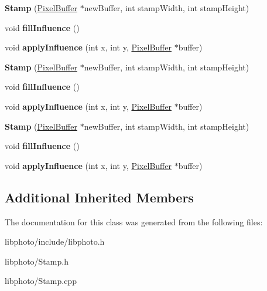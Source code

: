 \begin{DoxyCompactItemize}
\item 
\hypertarget{classStamp_a92ac49815361090e983b1adf13451dc5}{{\bfseries Stamp} (\hyperlink{classPixelBuffer}{Pixel\-Buffer} $\ast$new\-Buffer, int stamp\-Width, int stamp\-Height)}\label{classStamp_a92ac49815361090e983b1adf13451dc5}

\item 
\hypertarget{classStamp_a327f68b52c3043a538180461d5b96cb9}{void {\bfseries fill\-Influence} ()}\label{classStamp_a327f68b52c3043a538180461d5b96cb9}

\item 
\hypertarget{classStamp_ab41c9de007e2ad05a6b47e62b41fd7df}{void {\bfseries apply\-Influence} (int x, int y, \hyperlink{classPixelBuffer}{Pixel\-Buffer} $\ast$buffer)}\label{classStamp_ab41c9de007e2ad05a6b47e62b41fd7df}

\item 
\hypertarget{classStamp_a92ac49815361090e983b1adf13451dc5}{{\bfseries Stamp} (\hyperlink{classPixelBuffer}{Pixel\-Buffer} $\ast$new\-Buffer, int stamp\-Width, int stamp\-Height)}\label{classStamp_a92ac49815361090e983b1adf13451dc5}

\item 
\hypertarget{classStamp_a327f68b52c3043a538180461d5b96cb9}{void {\bfseries fill\-Influence} ()}\label{classStamp_a327f68b52c3043a538180461d5b96cb9}

\item 
\hypertarget{classStamp_ab41c9de007e2ad05a6b47e62b41fd7df}{void {\bfseries apply\-Influence} (int x, int y, \hyperlink{classPixelBuffer}{Pixel\-Buffer} $\ast$buffer)}\label{classStamp_ab41c9de007e2ad05a6b47e62b41fd7df}

\item 
\hypertarget{classStamp_a92ac49815361090e983b1adf13451dc5}{{\bfseries Stamp} (\hyperlink{classPixelBuffer}{Pixel\-Buffer} $\ast$new\-Buffer, int stamp\-Width, int stamp\-Height)}\label{classStamp_a92ac49815361090e983b1adf13451dc5}

\item 
\hypertarget{classStamp_a327f68b52c3043a538180461d5b96cb9}{void {\bfseries fill\-Influence} ()}\label{classStamp_a327f68b52c3043a538180461d5b96cb9}

\item 
\hypertarget{classStamp_ab41c9de007e2ad05a6b47e62b41fd7df}{void {\bfseries apply\-Influence} (int x, int y, \hyperlink{classPixelBuffer}{Pixel\-Buffer} $\ast$buffer)}\label{classStamp_ab41c9de007e2ad05a6b47e62b41fd7df}

\end{DoxyCompactItemize}
\subsection*{Additional Inherited Members}


The documentation for this class was generated from the following files\-:\begin{DoxyCompactItemize}
\item 
libphoto/include/libphoto.\-h\item 
libphoto/Stamp.\-h\item 
libphoto/Stamp.\-cpp\end{DoxyCompactItemize}
